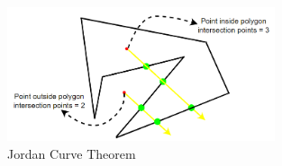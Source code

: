 \documentclass[13pt,a4paper]{article}
\begin{document}
\begin{itemize}
\begin{itemize}
					\begin{figure}[!h]
						\centering                                 \includegraphics[width=0.7\textwidth]{Robot_Global_Vision_Update/RGVU_fconfig_lefthand_1.png}
						\caption{Jordan Curve Theorem}
					\end{figure} \\
					

\end{itemize}
\end{itemize}
\end{document}
